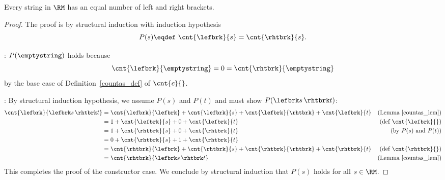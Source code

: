 \begin{lemma*}%
Every string in $\RM$ has an equal number of left and right brackets.

\begin{proof}
The proof is by structural induction with induction hypothesis
\[
P(s) \eqdef\  \cnt{\lefbrk}{s} = \cnt{\rhtbrk}{s}.
\]

: $P(\emptystring)$ holds because
\[
\cnt{\lefbrk}{\emptystring} = 0 = \cnt{\rhtbrk}{\emptystring}
\]
by the base case of Definition~\ref{countas_def} of $\cnt{c}{}$.

: By structural induction hypothesis, we assume
$P(s)$ and $P(t)$ and must show $P(\lefbrk s\,\rhtbrk t)$:
\begin{align*}
\cnt{\lefbrk}{\lefbrk s\,\rhtbrk t}
    & = \cnt{\lefbrk}{\lefbrk} + \cnt{\lefbrk}{s}
        +\cnt{\lefbrk}{\rhtbrk}+ \cnt{\lefbrk}{t}
         & \text{(Lemma~\ref{countas_lem})}\\
    & = 1 + \cnt{\lefbrk}{s} + 0 + \cnt{\lefbrk}{t}
         & \text{(def $\cnt{\lefbrk}{}$)}\\
    & = 1 + \cnt{\rhtbrk}{s} + 0 + \cnt{\rhtbrk}{t}
         & \text{(by $P(s)$ and $P(t)$)}\\
    & = 0 + \cnt{\rhtbrk}{s} + 1 + \cnt{\rhtbrk}{t}\\
    & = \cnt{\rhtbrk}{\lefbrk} + \cnt{\rhtbrk}{s}
        +\cnt{\rhtbrk}{\rhtbrk}+ \cnt{\rhtbrk}{t}
         & \text{(def $\cnt{\rhtbrk}{}$)}\\
    & = \cnt{\rhtbrk}{\lefbrk s\,\rhtbrk t}
            & \text{(Lemma~\ref{countas_lem})}
\end{align*}
This completes the proof of the constructor case.  We conclude by
structural induction that $P(s)$ holds for all $s \in\RM$.
\end{proof}
\end{lemma*}


\iffalse

The \term{depth} of a matched string is defined recursively as follows
\begin{definition}
The \emph{depth}, $d(s)$, of a string, $s \in\RM$, is defined
recursively by the rules:
\begin{itemize}
\item $d(\emptystring) \eqdef\  0.$
\item $d(\lefbrk s\,\rhtbrk t)
    \eqdef\ \max \set{d(s) + 1, d(t)}$
\end{itemize}
\end{definition}
\fi

